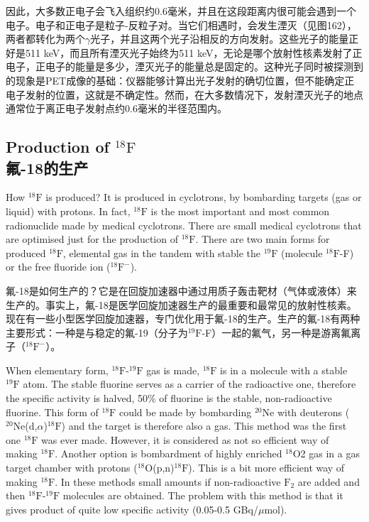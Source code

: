 \documentclass[dvipsnames, svgnames,a4paper,11pt]{article}
\begin{document}
因此，大多数正电子会飞入组织约0.6毫米，并且在这段距离内很可能会遇到一个电子。电子和正电子是粒子-反粒子对。当它们相遇时，会发生湮灭（见图162），两者都转化为两个$\gamma$光子，并且这两个光子沿相反的方向发射。这些光子的能量正好是511 keV，而且所有湮灭光子始终为511 keV，无论是哪个放射性核素发射了正电子，正电子的能量是多少，湮灭光子的能量总是固定的。这种光子同时被探测到的现象是PET成像的基础：仪器能够计算出光子发射的确切位置，但不能确定正电子发射的位置，这就是不确定性。然而，在大多数情况下，发射湮灭光子的地点通常位于离正电子发射点约0.6毫米的半径范围内。



\subsection{Production of ${}^\mathrm{18}\mathrm{F}$ \\氟-18的生产}
How ${}^\mathrm{18}\mathrm{F}$ is produced? It is produced in cyclotrons, by bombarding targets (gas or
liquid) with protons. In fact, ${}^\mathrm{18}\mathrm{F}$ is the most important and most common radionuclide
made by medical cyclotrons. There are small medical cyclotrons that are optimised
just for the production of ${}^\mathrm{18}\mathrm{F}$. There are two main forms for produced ${}^\mathrm{18}\mathrm{F}$, elemental
gas in the tandem with stable the ${}^\mathrm{19}\mathrm{F}$ (molecule ${}^\mathrm{18}\mathrm{F}$-F) or the free fluoride ion (${}^\mathrm{18}\mathrm{F^-}$).

氟-18是如何生产的？它是在回旋加速器中通过用质子轰击靶材（气体或液体）来生产的。事实上，氟-18是医学回旋加速器生产的最重要和最常见的放射性核素。现在有一些小型医学回旋加速器，专门优化用于氟-18的生产。生产的氟-18有两种主要形式：一种是与稳定的氟-19（分子为${}^\mathrm{19}\mathrm{F}$-F）一起的氟气，另一种是游离氟离子（${}^\mathrm{18}\mathrm{F^-}$）。

When elementary form, ${}^\mathrm{18}\mathrm{F}$-${}^\mathrm{19}\mathrm{F}$ gas is made, ${}^\mathrm{18}\mathrm{F}$ is in a molecule with a stable ${}^\mathrm{19}\mathrm{F}$
atom. The stable fluorine serves as a carrier of the radioactive one, therefore the
specific activity is halved, 50\% of fluorine is the stable, non-radioactive fluorine. This
form of ${}^\mathrm{18}\mathrm{F}$ could be made by bombarding ${}^\mathrm{20}\mathrm{Ne}$ with deuterons (${}^\mathrm{20}\mathrm{Ne}$(d,$\alpha$)${}^\mathrm{18}\mathrm{F}$) and the
target is therefore also a gas. This method was the first one ${}^\mathrm{18}\mathrm{F}$ was ever made.
However, it is considered as not so efficient way of making ${}^\mathrm{18}\mathrm{F}$. Another option is
bombardment of highly enriched ${}^\mathrm{18}\mathrm{O}$2 gas in a gas target chamber with protons
(${}^\mathrm{18}\mathrm{O}$(p,n)${}^\mathrm{18}\mathrm{F}$). This is a bit more efficient way of making ${}^\mathrm{18}\mathrm{F}$. In these methods small
amounts if non-radioactive $\mathrm{F}_2$ are added and then ${}^\mathrm{18}\mathrm{F}$-${}^\mathrm{19}\mathrm{F}$ molecules are obtained.
The problem with this method is that it gives product of quite low specific activity
(0.05-0.5 GBq/$\mu$mol).
\end{document}
